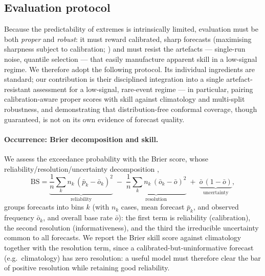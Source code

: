 \documentclass[11pt,a4paper]{article}
\begin{document}
\subsection{Evaluation protocol}\label{sec:metrics}
Because the predictability of extremes is intrinsically limited, evaluation must
be both \emph{proper} and \emph{robust}: it must reward calibrated, sharp
forecasts (maximising sharpness subject to calibration;
\citealp{gneiting2007sharpness}) and must resist the artefacts --- single-run
noise, quantile selection --- that easily manufacture apparent skill in a
low-signal regime. We therefore adopt the following protocol. Its individual
ingredients are standard; our contribution is their disciplined integration into
a single artefact-resistant assessment for a low-signal, rare-event regime --- in
particular, pairing calibration-aware proper scores with skill against climatology
and multi-split robustness, and demonstrating that distribution-free conformal
coverage, though guaranteed, is not on its own evidence of forecast quality.

\paragraph{Occurrence: Brier decomposition and skill.} We assess the exceedance
probability with the Brier score, whose reliability/resolution/uncertainty
decomposition \citep{murphy1973},
\begin{equation}\label{eq:brier}
\mathrm{BS} = \underbrace{\frac{1}{n}\sum_{k} n_k\,(\bar p_k-\bar o_k)^2}_{	\text{reliability}}
\;-\; \underbrace{\frac{1}{n}\sum_{k} n_k\,(\bar o_k-\bar o)^2}_{	\text{resolution}}
\;+\; \underbrace{\bar o\,(1-\bar o)}_{	\text{uncertainty}},
\end{equation}
groups forecasts into bins $k$ (with $n_k$ cases, mean forecast $\bar p_k$, and
observed frequency $\bar o_k$, and overall base rate $\bar o$): the first term is
reliability (calibration), the second resolution (informativeness), and the third
the irreducible uncertainty common to all forecasts. We report the Brier skill
score against climatology together with the resolution term, since a
calibrated-but-uninformative forecast (e.g.\ climatology) has zero resolution: a
useful model must therefore clear the bar of positive resolution while retaining
good reliability.
\end{document}
